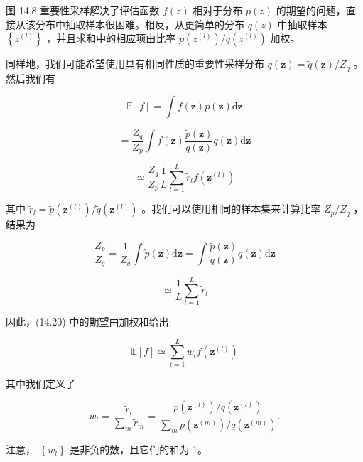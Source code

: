 \documentclass[10pt]{report}
\begin{document}
图 14.8 重要性采样解决了评估函数 \(f\left( z\right)\) 相对于分布 \(p\left( z\right)\) 的期望的问题，直接从该分布中抽取样本很困难。相反，从更简单的分布 \(q\left( z\right)\) 中抽取样本 \(\left\{  {z}^{\left( l\right) }\right\}\) ，并且求和中的相应项由比率 \(p\left( {z}^{\left( l\right) }\right) /q\left( {z}^{\left( l\right) }\right)\) 加权。

同样地，我们可能希望使用具有相同性质的重要性采样分布 \(q\left( \mathbf{z}\right)  = \widetilde{q}\left( \mathbf{z}\right) /{Z}_{q}\) 。然后我们有

\[
\mathbb{E}\left\lbrack  f\right\rbrack   = \int f\left( \mathbf{z}\right) p\left( \mathbf{z}\right) \mathrm{d}\mathbf{z}
\]

\[
= \frac{{Z}_{q}}{{Z}_{p}}\int f\left( \mathbf{z}\right) \frac{\widetilde{p}\left( \mathbf{z}\right) }{\widetilde{q}\left( \mathbf{z}\right) }q\left( \mathbf{z}\right) \mathrm{d}\mathbf{z}
\]

\[
\simeq  \frac{{Z}_{q}}{{Z}_{p}}\frac{1}{L}\mathop{\sum }\limits_{{l = 1}}^{L}{\widetilde{r}}_{l}f\left( {\mathbf{z}}^{\left( l\right) }\right)  \tag{14.20}
\]

其中 \({\widetilde{r}}_{l} = \widetilde{p}\left( {\mathbf{z}}^{\left( l\right) }\right) /\widetilde{q}\left( {\mathbf{z}}^{\left( l\right) }\right)\) 。我们可以使用相同的样本集来计算比率 \({Z}_{p}/{Z}_{q}\) ，结果为

\[
\frac{{Z}_{p}}{{Z}_{q}} = \frac{1}{{Z}_{q}}\int \widetilde{p}\left( \mathbf{z}\right) \mathrm{d}\mathbf{z} = \int \frac{\widetilde{p}\left( \mathbf{z}\right) }{\widetilde{q}\left( \mathbf{z}\right) }q\left( \mathbf{z}\right) \mathrm{d}\mathbf{z}
\]

\[
\simeq  \frac{1}{L}\mathop{\sum }\limits_{{l = 1}}^{L}{\widetilde{r}}_{l} \tag{14.21}
\]

因此，(14.20) 中的期望由加权和给出:

\[
\mathbb{E}\left\lbrack  f\right\rbrack   \simeq  \mathop{\sum }\limits_{{l = 1}}^{L}{w}_{l}f\left( {\mathbf{z}}^{\left( l\right) }\right)  \tag{14.22}
\]

其中我们定义了

\[
{w}_{l} = \frac{{\widetilde{r}}_{l}}{\mathop{\sum }\limits_{m}{\widetilde{r}}_{m}} = \frac{\widetilde{p}\left( {\mathbf{z}}^{\left( l\right) }\right) /q\left( {\mathbf{z}}^{\left( l\right) }\right) }{\mathop{\sum }\limits_{m}\widetilde{p}\left( {\mathbf{z}}^{\left( m\right) }\right) /q\left( {\mathbf{z}}^{\left( m\right) }\right) }. \tag{14.23}
\]

注意， \(\left\{  {w}_{l}\right\}\) 是非负的数，且它们的和为 1。
\end{document}
